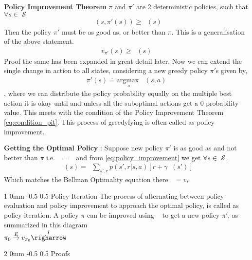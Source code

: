 \documentclass[twocolumn,11pt]{article}
\makeatletter
\DeclareMathOperator{\state}{\mathcal{S}}
\DeclareMathOperator{\qp}{q_\pi} %
\DeclareMathOperator{\vp}{v_\pi} %
\DeclareMathOperator{\vpd}{v_{\pi'}}
\DeclareMathOperator{\maxa}{\underset{a}{\text{max }}}
\renewcommand{\section}{\@startsection
{section}%
{2}%
{0mm}%
{-0.5\baselineskip}%
{0.5\baselineskip}%
{\bfseries\color{blue}}} %
\renewcommand{\subsection}{\@startsection
{subsection}%
{1}%
{0mm}%
{-0.5\baselineskip}%
{0.5\baselineskip}%
{\bfseries\color{blue}}} %
\makeatother
\begin{document}
\textbf{Policy Improvement Theorem } $\pi$ and $\pi'$ are 2 deterministic policies, such that $\forall s \in \state$\useshortskip
\begin{align} \label{eq:condition_pit}
	\qp(s, \pi'(s)) \geq \vp(s)
\end{align}
Then the policy $\pi'$ must be as good as, or better than $\pi$. This is a generalisation of the above statement.\useshortskip
\begin{align}
	v_{\pi'}(s) \geq \vp(s)
\end{align}
Proof the same has been expanded in great detail later. Now we can extend the single change in action to all states, considering a new greedy policy $\pi'$s given  by, 
\begin{align}\label{eq:policy_improvement}
	\pi'(s)  \doteq  \underset{a}{\text{argmax }} \qp(s,a)
\end{align} ,
where we  can distribute the policy probability equally on the multiple best action it is okay until and unless all the suboptimal actions get a 0 probability value. This meets with the condition of  the Policy Improvement Theorem \ref{eq:condition_pit}. This process of greedyfying is often called as policy improvement.

\textbf{Getting the Optimal Policy} : Suppose new  policy $\pi'$ is as good as and not better than $\pi$ i.e. $\vp = \vpd$ and from \ref{eq:policy_improvement}  we get  $\forall s \in \state$. \useshortskip
\begin{align*}
	\vpd(s) = \maxa \sum_{s',r} p(s',r|s,a) [r + \gamma \vpd(s')]
\end{align*}
Which matches the Bellman Optimality equation there $\vpd = v_*$

\subsection{Policy Iteration}
The process of alternating between policy evaluation and policy improvement to approach the optimal policy, is called as policy iteration. A policy $\pi$ can be improved using $\vp$ to get a new policy $\pi'$, as summarized in this diagram\\
$\pi_0 \overset{E}{\rightarrow} v_{\pi_0} \overset{I}{\righarrow}  $



\section{Proofs}
\end{document}
